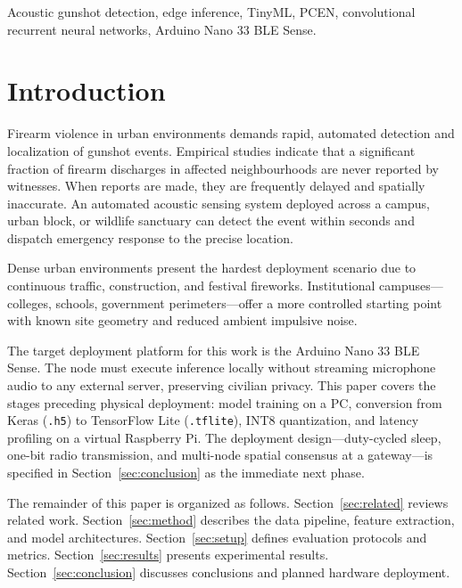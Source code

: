 \documentclass[conference]{IEEEtran}
\begin{document}
\begin{IEEEkeywords}
Acoustic gunshot detection, edge inference, TinyML, PCEN, convolutional recurrent neural networks, Arduino Nano 33 BLE Sense.
\end{IEEEkeywords}

\section{Introduction}
\label{sec:intro}

Firearm violence in urban environments demands rapid, automated detection and localization of gunshot events. Empirical studies indicate that a significant fraction of firearm discharges in affected neighbourhoods are never reported by witnesses. When reports are made, they are frequently delayed and spatially inaccurate. An automated acoustic sensing system deployed across a campus, urban block, or wildlife sanctuary can detect the event within seconds and dispatch emergency response to the precise location.

Dense urban environments present the hardest deployment scenario due to continuous traffic, construction, and festival fireworks. Institutional campuses---colleges, schools, government perimeters---offer a more controlled starting point with known site geometry and reduced ambient impulsive noise.

The target deployment platform for this work is the Arduino Nano 33 BLE Sense. The node must execute inference locally without streaming microphone audio to any external server, preserving civilian privacy. This paper covers the stages preceding physical deployment: model training on a PC, conversion from Keras (\texttt{.h5}) to TensorFlow Lite (\texttt{.tflite}), INT8 quantization, and latency profiling on a virtual Raspberry Pi. The deployment design---duty-cycled sleep, one-bit radio transmission, and multi-node spatial consensus at a gateway---is specified in Section~\ref{sec:conclusion} as the immediate next phase.

The remainder of this paper is organized as follows. Section~\ref{sec:related} reviews related work. Section~\ref{sec:method} describes the data pipeline, feature extraction, and model architectures. Section~\ref{sec:setup} defines evaluation protocols and metrics. Section~\ref{sec:results} presents experimental results. Section~\ref{sec:conclusion} discusses conclusions and planned hardware deployment.
\end{document}
